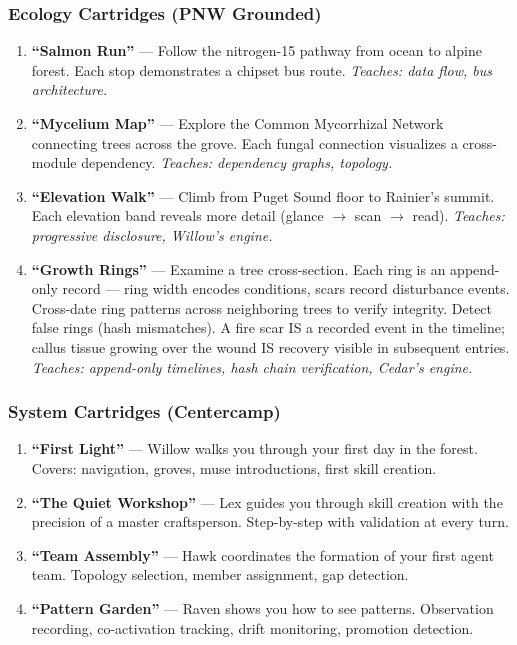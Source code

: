 \documentclass[11pt,letterpaper]{article}
\begin{document}
\subsubsection{Ecology Cartridges (PNW Grounded)}

\begin{enumerate}
\item \textbf{``Salmon Run''} --- Follow the nitrogen-15 pathway from ocean to alpine forest. Each stop demonstrates a chipset bus route. \emph{Teaches: data flow, bus architecture.}
\item \textbf{``Mycelium Map''} --- Explore the Common Mycorrhizal Network connecting trees across the grove. Each fungal connection visualizes a cross-module dependency. \emph{Teaches: dependency graphs, topology.}
\item \textbf{``Elevation Walk''} --- Climb from Puget Sound floor to Rainier's summit. Each elevation band reveals more detail (glance $\rightarrow$ scan $\rightarrow$ read). \emph{Teaches: progressive disclosure, Willow's engine.}
\item \textbf{``Growth Rings''} --- Examine a tree cross-section. Each ring is an append-only record --- ring width encodes conditions, scars record disturbance events. Cross-date ring patterns across neighboring trees to verify integrity. Detect false rings (hash mismatches). A fire scar IS a recorded event in the timeline; callus tissue growing over the wound IS recovery visible in subsequent entries. \emph{Teaches: append-only timelines, hash chain verification, Cedar's engine.}
\end{enumerate}

\subsubsection{System Cartridges (Centercamp)}

\begin{enumerate}[resume]
\item \textbf{``First Light''} --- Willow walks you through your first day in the forest. Covers: navigation, groves, muse introductions, first skill creation.
\item \textbf{``The Quiet Workshop''} --- Lex guides you through skill creation with the precision of a master craftsperson. Step-by-step with validation at every turn.
\item \textbf{``Team Assembly''} --- Hawk coordinates the formation of your first agent team. Topology selection, member assignment, gap detection.
\item \textbf{``Pattern Garden''} --- Raven shows you how to see patterns. Observation recording, co-activation tracking, drift monitoring, promotion detection.
\end{enumerate}
\end{document}
